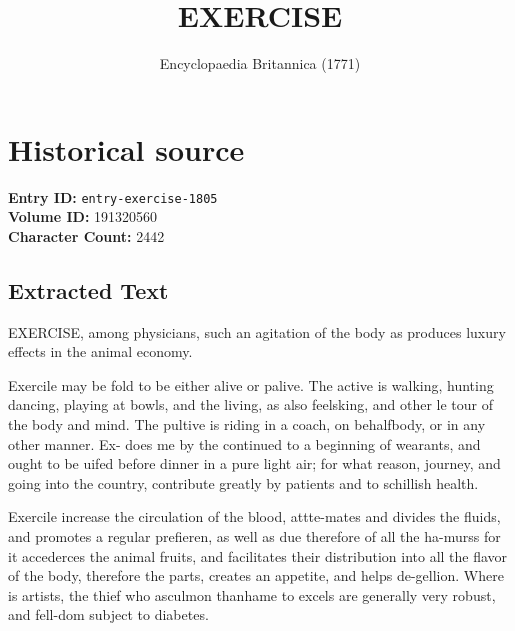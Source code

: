 \documentclass{article}
\title{EXERCISE}
\date{Encyclopaedia Britannica (1771)}
\begin{document}
\maketitle

\section*{Historical source}
\textbf{Entry ID:} \texttt{entry-exercise-1805} \\
\textbf{Volume ID:} 191320560 \\
\textbf{Character Count:} 2442

\subsection*{Extracted Text}
EXERCISE, among physicians, such an agitation of the body as produces luxury effects in the animal economy.

Exercile may be fold to be either alive or palive. The active is walking, hunting dancing, playing at bowls, and the living, as also feelsking, and other le tour of the body and mind. The pultive is riding in a coach, on behalfbody, or in any other manner. Ex- does me by the continued to a beginning of wearants, and ought to be uifed before dinner in a pure light air; for what reason, journey, and going into the country, contribute greatly by patients and to schillish health.

Exercile increase the circulation of the blood, attte-mates and divides the fluids, and promotes a regular prefieren, as well as due therefore of all the ha-murss for it accederces the animal fruits, and facilitates their distribution into all the flavor of the body, therefore the parts, creates an appetite, and helps de-gellion. Where is artists, the thief who asculmon thanhame to excels are generally very robust, and fell-dom subject to diabetes.
\end{document}
